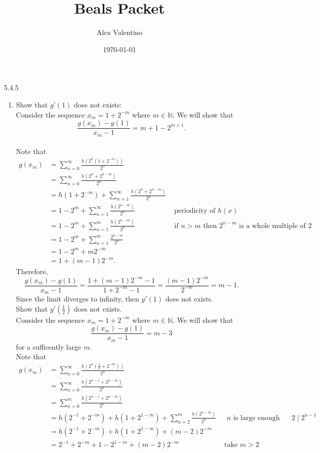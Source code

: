 \documentclass[12pt, letterpaper]{article}
\date{\today}
\author{Alex Valentino}
\title{Beals Packet}
\newcommand{\N}{\mathbb{N}}
\begin{document}
\begin{enumerate}
	\item[5.4.5]
	\begin{enumerate}
		\item Show that $g'(1)$ does not exists:\\
		Consider the sequence $x_m = 1 + 2^{-m}$ where $m \in \N$.  We will show that 
		$$\frac{g(x_m)-g(1)}{x_m - 1} = m + 1 - 2^{m+1}.$$ \\
		Note that 
		\begin{align*}
		g(x_m) &= \sum_{n=0}^\infty \frac{h(2^n(1 + 2^{-m}))}{2^n}\\
		&= \sum_{n=0}^\infty \frac{h(2^{n} + 2^{n-m})}{2^n}\\
		&= h(1+2^{-m}) + \sum_{n=1}^\infty \frac{h(2^{n} + 2^{n-m})}{2^n}\\
		&= 1-2^{m} + \sum_{n=1}^\infty \frac{h(2^{n-m})}{2^n} & \text{ periodicity of $h(x)$}\\ 
		&= 1-2^{m} + \sum_{n=1}^m \frac{h(2^{n-m})}{2^n} & \text{ if $n > m$ then $2^{n-m}$ is a whole multiple of 2}\\
		&= 1-2^{m} + \sum_{n=1}^m \frac{2^{n-m}}{2^n}\\		
		&= 1-2^{m} + m2^{-m}\\
		&= 1 + (m-1)2^{-m}. 
		\end{align*}
		Therefore, $$\frac{g(x_m)-g(1)}{x_m - 1} = \frac{1 + (m-1)2^{-m} - 1}{1 + 2^{-m} - 1}
		= \frac{(m-1)2^{-m}}{2^{-m}} = m-1.$$
		Since the limit diverges to infinity, then $g'(1)$ does not exists.\\
		Show that $g'(\frac{1}{2})$ does not exists.\\
		Consider the sequence $x_m = 1 + 2^{-m}$ where $m \in \N$.  We will show that 
		$$ \frac{g(x_m)-g(1)}{x_m - 1} = m-3$$
		for a sufficently large $m$.  		
		\\
		Note that 
		\begin{align*}
			g(x_m) &= \sum_{n=0}^\infty \frac{h(2^n(\frac{1}{2} + 2^{-m}))}{2^n}\\
			&= \sum_{n=0}^\infty \frac{h(2^{n-1}+ 2^{n-m})}{2^n}\\
			&= \sum_{n=0}^m \frac{h(2^{n-1}+ 2^{n-m})}{2^n}\\
			&= h(2^{-1}+ 2^{-m}) + h(1+ 2^{1-m}) + \sum_{n=2}^m \frac{h(2^{n-m})}{2^n} & \text{ $n$ is large enough that 
			$2 \mid 2^{n-1}$}\\	
			&= h(2^{-1}+ 2^{-m}) + h(1+ 2^{1-m}) + (m-2)2^{-m} &\\
			&= 2^{-1}+ 2^{-m} + 1 - 2^{1-m} + (m-2)2^{-m} & \text{ take $m>2$}\\

\end{align*}
\end{enumerate}
\end{enumerate}
\end{document}
